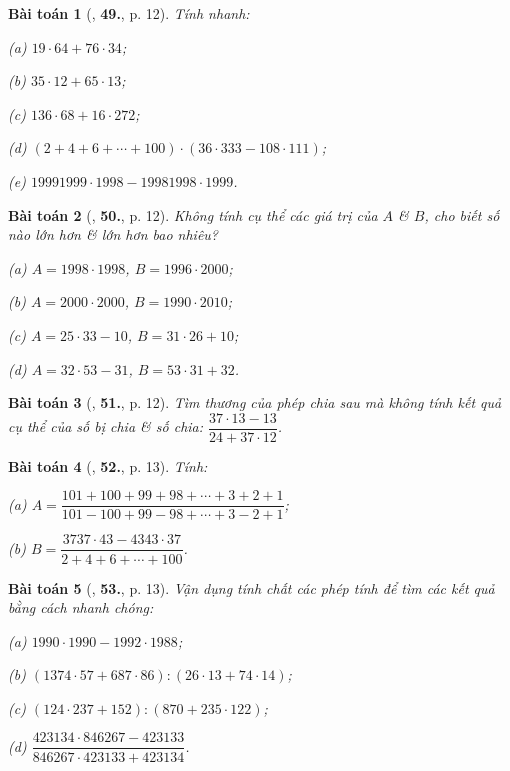 \documentclass{article}
\numberwithin{equation}{section}
\newtheorem{baitoan}{Bài toán}
\begin{document}
\begin{baitoan}[\cite{Binh_Toan_6_tap_1}, \textbf{49.}, p. 12]
	Tính nhanh:
	\begin{enumerate*}
		\item[(a)] $19\cdot64 + 76\cdot34$;
		\item[(b)] $35\cdot12 + 65\cdot13$;
		\item[(c)] $136\cdot68 + 16\cdot272$;
		\item[(d)] $(2 + 4 + 6 + \cdots + 100)\cdot(36\cdot333 - 108\cdot111)$;
		\item[(e)] $19991999\cdot1998 - 19981998\cdot1999$.
	\end{enumerate*}
\end{baitoan}

\begin{baitoan}[\cite{Binh_Toan_6_tap_1}, \textbf{50.}, p. 12]
	Không tính cụ thể các giá trị của $A$ \& $B$, cho biết số nào lớn hơn \& lớn hơn bao nhiêu?
	\begin{enumerate*}
		\item[(a)] $A = 1998\cdot1998$, $B = 1996\cdot2000$;
		\item[(b)] $A = 2000\cdot2000$, $B = 1990\cdot2010$;
		\item[(c)] $A = 25\cdot33 - 10$, $B = 31\cdot26 + 10$;
		\item[(d)] $A = 32\cdot53 - 31$, $B = 53\cdot31 + 32$.
	\end{enumerate*}
\end{baitoan}

\begin{baitoan}[\cite{Binh_Toan_6_tap_1}, \textbf{51.}, p. 12]
	Tìm thương của phép chia sau mà không tính kết quả cụ thể của số bị chia \& số chia: $\dfrac{37\cdot13 - 13}{24 + 37\cdot12}$.
\end{baitoan}

\begin{baitoan}[\cite{Binh_Toan_6_tap_1}, \textbf{52.}, p. 13]
	Tính:
	\begin{enumerate*}
		\item[(a)] $A = \dfrac{101 + 100 + 99 + 98 + \cdots + 3 + 2 + 1}{101 - 100 + 99 - 98 + \cdots + 3 - 2 + 1}$;
		\item[(b)] $B = \dfrac{3737\cdot43 - 4343\cdot37}{2 + 4 + 6 + \cdots + 100}$.
	\end{enumerate*}
\end{baitoan}

\begin{baitoan}[\cite{Binh_Toan_6_tap_1}, \textbf{53.}, p. 13]
	Vận dụng tính chất các phép tính để tìm các kết quả bằng cách nhanh chóng:
	\begin{enumerate*}
		\item[(a)] $1990\cdot1990 - 1992\cdot1988$;
		\item[(b)] $(1374\cdot57 + 687\cdot86):(26\cdot13 + 74\cdot14)$;
		\item[(c)] $(124\cdot237 + 152):(870 + 235\cdot122)$;
		\item[(d)] $\dfrac{423134\cdot846267 - 423133}{846267\cdot423133 + 423134}$.
	\end{enumerate*}
\end{baitoan}
\end{document}
